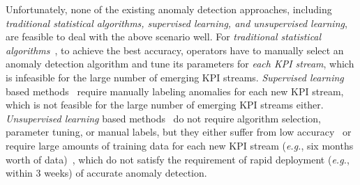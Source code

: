 	
Unfortunately, none of the existing anomaly detection approaches, including \emph{traditional statistical algorithms, supervised learning, and unsupervised learning}, are feasible to deal with the above scenario well. 
For \emph{traditional statistical algorithms}~\cite{Mahimkar:2011:RDM:2079296.2079309, barford2002signal, Zhang:2005:NA:1251086.1251116, yan2012argus}, to achieve the best accuracy, operators have to manually select an anomaly detection algorithm and tune its parameters for \emph{each KPI stream}, which is infeasible for the large number of emerging KPI streams. \emph{Supervised learning} based methods~\cite{egads, liu2015opprentice} require manually labeling anomalies for each new KPI stream, which is not feasible for the large number of emerging KPI streams either. \emph{Unsupervised learning} based methods~\cite{ding2013anomaly, xu2018unsupervised} do not require algorithm selection, parameter tuning, or manual labels, but they either suffer from low accuracy~\cite{zhang2018anomaly} or require large amounts of training data for each new KPI stream (\textit{e.g.}, six months worth of data)~\cite{xu2018unsupervised}, which do not satisfy the requirement of rapid deployment (\textit{e.g.}, within 3 weeks) of accurate anomaly detection.



